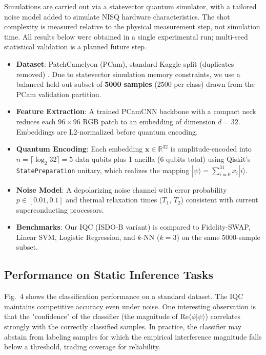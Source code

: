 \documentclass[conference]{IEEEtran}
\begin{document}
Simulations are carried out via a statevector quantum simulator, with a tailored noise model added to simulate NISQ hardware characteristics. The shot complexity is measured relative to the physical measurement step, not simulation time. All results below were obtained in a single experimental run; multi-seed statistical validation is a planned future step.
\begin{itemize}
    \item \textbf{Dataset}: PatchCamelyon (PCam), standard Kaggle split (duplicates removed) \cite{pcam_veeling2018}. Due to statevector simulation memory constraints, we use a balanced held-out subset of \textbf{5000 samples} (2500 per class) drawn from the PCam validation partition.
    \item \textbf{Feature Extraction}: A trained PCamCNN backbone with a compact neck reduces each 96\,$\times$\,96 RGB patch to an embedding of dimension $d = 32$. Embeddings are L2-normalized before quantum encoding.
    \item \textbf{Quantum Encoding}: Each embedding $\mathbf{x} \in \mathbb{R}^{32}$ is amplitude-encoded into $n = \lceil \log_2 32 \rceil = 5$ data qubits plus 1 ancilla (6 qubits total) using Qiskit's \texttt{StatePreparation} unitary, which realizes the mapping $|\psi\rangle = \sum_{i=0}^{31} x_i|i\rangle$.
    \item \textbf{Noise Model}: A depolarizing noise channel with error probability $p \in [0.01, 0.1]$ and thermal relaxation times ($T_1$, $T_2$) consistent with current superconducting processors.
    \item \textbf{Benchmarks}: Our IQC (ISDO-B variant) is compared to Fidelity-SWAP, Linear SVM, Logistic Regression, and $k$-NN ($k=3$) on the same 5000-sample subset.
\end{itemize}

\subsection{Performance on Static Inference Tasks}

Fig.~4 shows the classification performance on a standard dataset. The IQC maintains competitive accuracy even under noise. One interesting observation is that the "confidence" of the classifier (the magnitude of $\text{Re}\langle \phi|\psi \rangle$) correlates strongly with the correctly classified samples. In practice, the classifier may abstain from labeling samples for which the empirical interference magnitude falls below a threshold, trading coverage for reliability.
\end{document}
